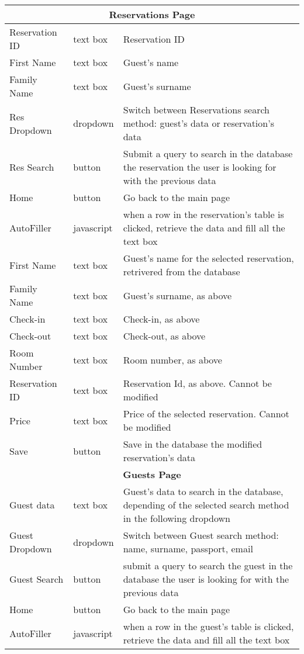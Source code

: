 \documentclass{article}
\begin{document}
\begin{center}
\begin{longtable}{| l | l | p{7cm} |}
	\hline \hline
	\multicolumn{3}{|c|}{\textbf{Reservations Page}} \\ 
	\hline \hline
	Reservation ID	& text box 		& Reservation ID \\ 
	First Name 		& text box	 	& Guest's name \\ 
	Family Name	 	& text box 		& Guest's surname \\ 
	Res Dropdown 	& dropdown 		& Switch between Reservations search method: guest's data or reservation's data \\ 
	Res Search		& button		& Submit a query to search in the database the reservation the user is looking for with the previous data \\
	Home			& button		& Go back to the main page \\
	\hline
	AutoFiller		& javascript	& when a row in the reservation's table is clicked, retrieve the data and fill all the text box \\
	First Name		& text box		& Guest's name for the selected reservation, retrivered from the database \\
	Family Name		& text box		& Guest's surname, as above \\
	Check-in		& text box		& Check-in, as above \\
	Check-out		& text box		& Check-out, as above \\
	Room Number		& text box		& Room number, as above \\
	Reservation ID	& text box		& Reservation Id, as above. Cannot be modified \\
	Price			& text box		& Price of the selected reservation. Cannot be modified \\
	Save			& button		& Save in the database the modified reservation's data \\
	\hline \hline
	\multicolumn{3}{|c|}{\textbf{Guests Page}} \\ 
	\hline \hline
	Guest data		& text box		& Guest's data to search in the database, depending of the selected search method in the following dropdown \\ 
	Guest Dropdown	& dropdown 		& Switch between Guest search method: name, surname, passport, email \\ 
	Guest Search	& button		& submit a query to search the guest in the database the user is looking for with the previous data \\
	Home			& button		& Go back to the main page \\
	\hline
	AutoFiller		& javascript	& when a row in the guest's table is clicked, retrieve the data and fill all the text box \\

\end{longtable}
\end{center}
\end{document}
